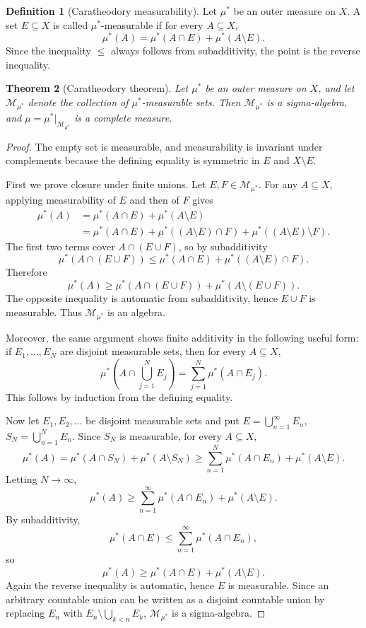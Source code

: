 \documentclass[11pt,openany]{book}
\numberwithin{equation}{chapter}
\theoremstyle{definition}
\newtheorem{definition}{Definition}[chapter]
\theoremstyle{plain}
\newtheorem{theorem}[definition]{Theorem}
\theoremstyle{remark}
\newcommand{\M}{\mathcal{M}}
\newcommand{\1}{\mathbf{1}}
\begin{document}
\begin{definition}[Caratheodory measurability]
Let \(\mu^*\) be an outer measure on \(X\). A set \(E\subseteq X\) is called \(\mu^*\)-measurable if for every \(A\subseteq X\),
\[
  \mu^*(A)=\mu^*(A\cap E)+\mu^*(A\setminus E).
\]
Since the inequality \(\leq\) always follows from subadditivity, the point is the reverse inequality.
\end{definition}

\begin{theorem}[Caratheodory theorem]
Let \(\mu^*\) be an outer measure on \(X\), and let \(\M_{\mu^*}\) denote the collection of \(\mu^*\)-measurable sets. Then \(\M_{\mu^*}\) is a sigma-algebra, and \(\mu=\mu^*|_{\M_{\mu^*}}\) is a complete measure.
\end{theorem}

\begin{proof}
The empty set is measurable, and measurability is invariant under complements because the defining equality is symmetric in \(E\) and \(X\setminus E\).

First we prove closure under finite unions. Let \(E,F\in\M_{\mu^*}\). For any \(A\subseteq X\), applying measurability of \(E\) and then of \(F\) gives
\begin{align*}
\mu^*(A)
&=\mu^*(A\cap E)+\mu^*(A\setminus E)\\
&=\mu^*(A\cap E)+\mu^*((A\setminus E)\cap F)+\mu^*((A\setminus E)\setminus F).
\end{align*}
The first two terms cover \(A\cap(E\cup F)\), so by subadditivity
\[
  \mu^*(A\cap(E\cup F))
  \leq \mu^*(A\cap E)+\mu^*((A\setminus E)\cap F).
\]
Therefore
\[
  \mu^*(A)\geq \mu^*(A\cap(E\cup F))+\mu^*(A\setminus(E\cup F)).
\]
The opposite inequality is automatic from subadditivity, hence \(E\cup F\) is measurable. Thus \(\M_{\mu^*}\) is an algebra.

Moreover, the same argument shows finite additivity in the following useful form: if \(E_1,\ldots,E_N\) are disjoint measurable sets, then for every \(A\subseteq X\),
\[
  \mu^*\left(A\cap\bigcup_{j=1}^NE_j\right)=\sum_{j=1}^N\mu^*(A\cap E_j).
\]
This follows by induction from the defining equality.

Now let \(E_1,E_2,\ldots\) be disjoint measurable sets and put \(E=\bigcup_{n=1}^{\infty}E_n\), \(S_N=\bigcup_{n=1}^NE_n\). Since \(S_N\) is measurable, for every \(A\subseteq X\),
\[
  \mu^*(A)=\mu^*(A\cap S_N)+\mu^*(A\setminus S_N)
  \geq \sum_{n=1}^N\mu^*(A\cap E_n)+\mu^*(A\setminus E).
\]
Letting \(N\to\infty\),
\[
  \mu^*(A)
  \geq \sum_{n=1}^{\infty}\mu^*(A\cap E_n)+\mu^*(A\setminus E).
\]
By subadditivity,
\[
  \mu^*(A\cap E)\leq \sum_{n=1}^{\infty}\mu^*(A\cap E_n),
\]
so
\[
  \mu^*(A)
  \geq \mu^*(A\cap E)+\mu^*(A\setminus E).
\]
Again the reverse inequality is automatic, hence \(E\) is measurable. Since an arbitrary countable union can be written as a disjoint countable union by replacing \(E_n\) with \(E_n\setminus\bigcup_{k<n}E_k\), \(\M_{\mu^*}\) is a sigma-algebra.


\end{proof}
\end{document}
